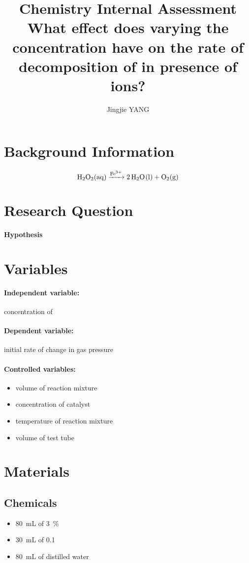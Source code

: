 \documentclass[a4paper, 12pt]{article}
\title{
\textbf{Chemistry Internal Assessment}\\
\bigskip
What effect does varying the concentration have on the rate of decomposition of \ce{H2O2} in presence of \ce{Fe^3+} ions?
}
\author{Jingjie YANG}
\date{}
\begin{document}
\maketitle

\section{Background Information}
$$\ce{H2O2(aq) ->[Fe^3+] 2H2O(l) + O2(g)}$$

\section{Research Question}
\paragraph{Hypothesis}

\section{Variables}
\paragraph{Independent variable:}
concentration of 

\paragraph{Dependent variable:}
initial rate of change in gas pressure

\paragraph{Controlled variables:}
\begin{itemize}
    \item volume of reaction mixture
    \item concentration of  catalyst
    \item temperature of reaction mixture
    \item volume of test tube
\end{itemize}

\section{Materials}
\subsection{Chemicals}
\begin{multicols}{2}
\begin{itemize}
    \item \SI{80}{\mL} of \SI{3}{\percent} 
    \item \SI{30}{\mL} of \SI{0.1}{\molar} 
\columnbreak
    \item \SI{80}{\mL} of distilled water
\end{itemize}
\end{multicols}
\end{document}
